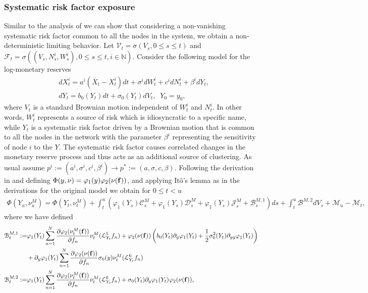 \documentclass[10pt]{article}
\theoremstyle{plain}
\theoremstyle{definition}
\newcommand{\<}{\langle}
\renewcommand{\>}{\rangle}
\renewcommand{\(}{\left(}
\renewcommand{\)}{\right)}
\renewcommand{\[}{\left[}
\renewcommand{\]}{\right]}
\def \phi {{\varphi}}
\begin{document}
\subsubsection{Systematic risk factor exposure}
Similar to the analysis of \citet{giesecke15} we can show that considering a non-vanishing systematic risk factor common to all the nodes in the system, we obtain a non-deterministic limiting behavior. Let $\mathcal{V}_t =\sigma(V_s,0\leq s\leq t)$ and $\mathcal{F}_t=\sigma((V_s,N_s^i,W_s^i),0\leq s\leq t, i\in\mathbb{N})$. Consider the following model for the log-monetary reserves
\begin{align}
&dX_t^i = a^i(\bar X_t-X_t^i)dt + \sigma^i dW_t^i + c^i dN_t^i + \beta^i dY_t,\label{eq:systrisksde}\\
&dY_t = b_0(Y_t)dt + \sigma_0(Y_t)dV_t,\;\; Y_0=y_0,
\end{align}
where $V_t$ is a standard Brownian motion independent of $W_t^i$ and $N_t^i$. In other words, $W_t^i$ represents a source of risk which is idiosyncratic to a specific name, while $Y_t$ is a systematic risk factor driven by a Brownian motion that is common to all the nodes in the network with the parameter $\beta^i$ representing the sensitivity of node $i$ to the $Y$. The systematic risk factor causes correlated changes in the monetary reserve process and thus acts as an additional source of clustering. As usual assume $p^i:=(a^i,\sigma^i,c^i,\beta^i)\rightarrow p^*:=(a,\sigma,c,\beta)$. Following the derivation in \citet{giesecke15} and defining $\Phi(y,\nu) = \phi_1(y)\phi_2(\nu(\bold{f}))$, and applying It\^ o's lemma as in the derivations for the original model we obtain for $0\leq t<u$
 \begin{align}
 \Phi(Y_u,\nu_u^M) = \Phi(Y_t,\nu_t^M) + \int_t^u(\phi_1(Y_s)\mathcal{C}_s^M+\phi_1(Y_s)\mathcal{D}_s^M+\phi_1(Y_s)\mathcal{J}_s^M + \mathcal{B}^{M,1}_s)ds + \int_t^u\mathcal{B}^{M,2}dV_s + \mathcal{M}_u-\mathcal{M}_t,
 \end{align}
 where we have defined
 \begin{align}
 \mathcal{B}^{M,1}_t := &\phi_1(Y_t)\sum_{n=1}^N\frac{\partial \phi_2(\nu_t^M(\bold{f}))}{\partial f_n}\nu_t^M(\mathcal{L}^5_{Y_t}f_n)+\phi_2(\nu(\bold{f}))\left(b_0(Y_t)\partial_y\phi_1(Y_t)+\frac{1}{2}\sigma_0^2(Y_t)\partial_{yy}\phi_1(Y_t)\right)\\
 &+\partial_y \phi_1(Y_t)\sum_{n=1}^N\frac{\partial \phi_2(\nu(\bold{f}))}{\partial f_n}\sigma_0(y)\nu_t^M(\mathcal{L}^6_{Y_t}f_n)\\
 \mathcal{B}^{M,2}_t:=&\phi_1(Y_t)\sum_{n=1}^N\frac{\partial \phi_2(\nu_t^M(\bold{f}))}{\partial f_n}\nu_t^M(\mathcal{L}^6_{Y_t}f_n)+\sigma_0(Y_t)\partial_y \phi_1(Y_t)\phi_2(\nu(\bold{f})),
 \end{align}
\end{document}
